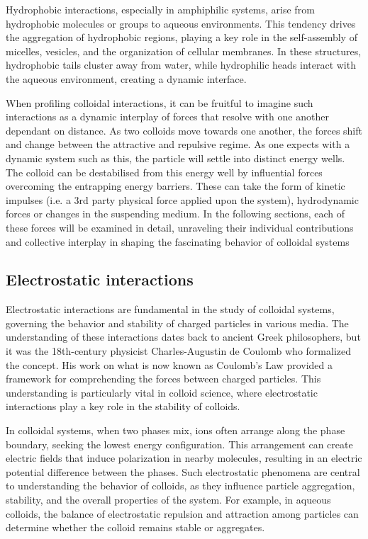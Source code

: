 Hydrophobic interactions, especially in amphiphilic systems, arise from hydrophobic molecules or groups to aqueous environments. This tendency drives the aggregation of hydrophobic regions, playing a key role in the self-assembly of micelles, vesicles, and the organization of cellular membranes. In these structures, hydrophobic tails cluster away from water, while hydrophilic heads interact with the aqueous environment, creating a dynamic interface. 

When profiling colloidal interactions, it can be fruitful to imagine such interactions as a dynamic interplay of forces that resolve with one another dependant on distance. As two colloids move towards one another, the forces shift and change between the attractive and repulsive regime. As one expects with a dynamic system such as this, the particle will settle into distinct energy wells. The colloid can be destabilised from this energy well by influential forces overcoming the entrapping energy barriers. These can take the form of kinetic impulses (i.e. a 3rd party physical force applied upon the system), hydrodynamic forces or changes in the suspending medium. In the following sections, each of these forces will be examined in detail, unraveling their individual contributions and collective interplay in shaping the fascinating behavior of colloidal systems


\subsection{Electrostatic interactions} %
Electrostatic interactions are fundamental in the study of colloidal systems, governing the behavior and stability of charged particles in various media. The understanding of these interactions dates back to ancient Greek philosophers, but it was the 18th-century physicist Charles-Augustin de Coulomb who formalized the concept. His work on what is now known as Coulomb's Law provided a framework for comprehending the forces between charged particles. This understanding is particularly vital in colloid science, where electrostatic interactions play a key role in the stability of colloids. \cite{halliday2013fundamentals}

In colloidal systems, when two phases mix, ions often arrange along the phase boundary, seeking the lowest energy configuration. This arrangement can create electric fields that induce polarization in nearby molecules, resulting in an electric potential difference between the phases. Such electrostatic phenomena are central to understanding the behavior of colloids, as they influence particle aggregation, stability, and the overall properties of the system. For example, in aqueous colloids, the balance of electrostatic repulsion and attraction among particles can determine whether the colloid remains stable or aggregates.

